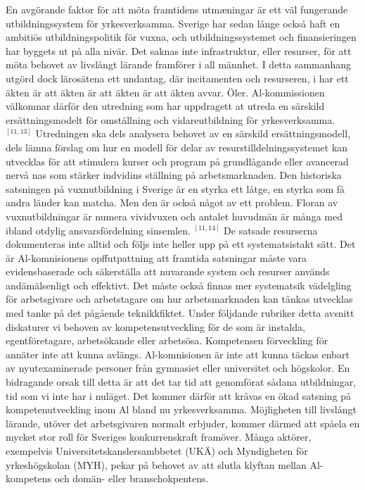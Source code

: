 {En avgörande faktor för att möta framtidens utmæningar är ett väl fungerande utbildningssystem för yrkesverksamma. Sverige har sedan långe också haft en ambitiös utbildningspolitik för vuxna, och utbildningssystemet och finansieringen har byggets ut på alla nivär. Det saknas inte infrastruktur, eller resurser, för att möta behovet av livslångt lärande framförer i all männhet. I detta sammanhang utgörd dock lärosätena ett undantag, där incitamenten och resurseren, i har ett äkten är att äkten är att äkten är att äkten avvar. Öler. Al-kommissionen välkomnar därför den utredning som har uppdragett at utreda en särskild ersättningsmodelt för omställning och vidareutbildning för yrkesverksamma. \({ }^{[11,13]}\) Utredningen ska dels analysera behovet av en särskild ersättningsmodell, dels lämna förslag om hur en modell för delar av resurstilldelningssystemet kan utvecklas för att stimulera kurser och program på grundlågande eller avancerad nervå nas som stärker indvidins ställning på arbetsmarknaden.
Den historiska satsningen på vuxnutbildning i Sverige är en styrka ett låtge, en styrka som få andra länder kan matcha. Men den är också något av ett problem. Floran av vuxnutbildningar är numera vividvuxen och antalet huvudmän är många med ibland otdylig ansvarsfördelning sinsemlen. \({ }^{[11,14]}\) De satsade resurserna dokumenteras inte alltid och följs inte heller upp på ett systematsistakt sätt. Det är Al-komnisionens opffutpattning att framtida satsningar måste vara evidensbaserade och säkerställa att nuvarande system och resurser används andämälsenligt och effektivt. Det måste också finnas mer systematsik vädelgling för arbetsgivare och arbetstagare om hur arbetsmarknaden kan tänkas utvecklas med tanke på det pågående teknikkfiktet. Under följdande rubriker detta avsnitt diskaturer vi behoven av kompetensutveckling för de som är instalda, egentföretagare, arbetsökande eller arbetsösa.
Kompetensen förveckling för annäter inte att kunna avlängs. Al-komnisionen är inte att kunna täckas enbart av nyutexaminerade personer från gymnasiet eller universitet och högskolor. En bidragande orsak till detta är att det tar tid att genomförat sådana utbildningar, tid som vi inte har i nuläget. Det kommer därför att kråvas en ökad satsning på kompetenutveckling inom Al bland nu yrkesverksamma. Möjligheten till livslångt lärande, utöver det arbetsgivaren normalt erbjuder, kommer därmed att spåela en mycket stor roll för Sveriges konkurrenskraft framöver. Många aktörer, exempelvis Universitetskanslersambbetet (UKÄ) och Myndigheten för yrkeshögskolan (MYH), pekar på behovet av att slutla klyftan mellan Al-kompetens och domän- eller branschokpentens.
}
